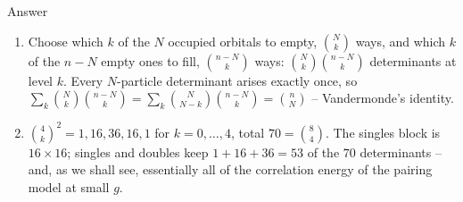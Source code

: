 \documentclass[aspectratio=169,10pt]{beamer}
\newcounter{thinkctr}
\newcommand{\thinka}[1]{%
  \begin{tcolorbox}[colback=paleteal,colframe=teal,title={\bfseries Answer to pause \#\thethinkctr}]
  #1
  \end{tcolorbox}}
\begin{document}
\begin{frame}{Answer}
  \thinka{
  \begin{enumerate}
    \item Choose which $k$ of the $N$ occupied orbitals to empty, $\binom{N}{k}$ ways, and which $k$ of the $n-N$ empty ones to fill, $\binom{n-N}{k}$ ways: $\binom{N}{k}\binom{n-N}{k}$ determinants at level $k$. Every $N$-particle determinant arises exactly once, so $\sum_k\binom{N}{k}\binom{n-N}{k}=\sum_k\binom{N}{N-k}\binom{n-N}{k}=\binom{n}{N}$ -- Vandermonde's identity.
    \item $\binom4k^2=1,16,36,16,1$ for $k=0,\dots,4$, total $70=\binom84$. The singles block is $16\times16$; singles and doubles keep $1+16+36=53$ of the $70$ determinants -- and, as we shall see, essentially all of the correlation energy of the pairing model at small $g$.
  \end{enumerate}}
\end{frame}
\end{document}
